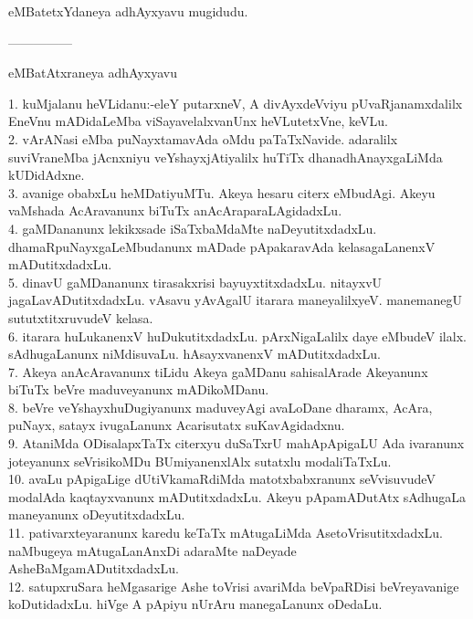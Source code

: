 \documentclass{article}
\begin{document}
\begin{center}
eMBatetxYdaneya adhAyxyavu mugidudu.
\end{center}

\begin{center}
---------------
\end{center}

\begin{center}
eMBatAtxraneya adhAyxyavu
\end{center}

1. kuMjalanu heVLidanu:-eleY putarxneV, A divAyxdeVviyu pUvaRjanamxdalilx EneVnu mADidaLeMba viSayavelalxvanUnx heVLutetxVne, keVLu.\\
2. vArANasi eMba puNayxtamavAda oMdu paTaTxNavide. adaralilx suviVraneMba jAcnxniyu veYshayxjAtiyalilx huTiTx dhanadhAnayxgaLiMda kUDidAdxne.\\
3. avanige obabxLu heMDatiyuMTu. Akeya hesaru citerx eMbudAgi. Akeyu vaMshada AcAravanunx biTuTx anAcAraparaLAgidadxLu.\\
4. gaMDananunx lekikxsade iSaTxbaMdaMte naDeyutitxdadxLu. dhamaRpuNayxgaLeMbudanunx mADade pApakaravAda kelasagaLanenxV mADutitxdadxLu.\\
5. dinavU gaMDananunx tirasakxrisi bayuyxtitxdadxLu. nitayxvU jagaLavADutitxdadxLu. vAsavu yAvAgalU itarara maneyalilxyeV. manemanegU sututxtitxruvudeV kelasa.\\
6. itarara huLukanenxV huDukutitxdadxLu. pArxNigaLalilx daye eMbudeV ilalx. sAdhugaLanunx niMdisuvaLu. hAsayxvanenxV mADutitxdadxLu.\\
7. Akeya anAcAravanunx tiLidu Akeya gaMDanu sahisalArade Akeyanunx biTuTx beVre maduveyanunx mADikoMDanu.\\
8. beVre veYshayxhuDugiyanunx maduveyAgi avaLoDane dharamx, AcAra, puNayx, satayx ivugaLanunx Acarisutatx suKavAgidadxnu.\\
9. AtaniMda ODisalapxTaTx citerxyu duSaTxrU mahApApigaLU Ada ivaranunx joteyanunx seVrisikoMDu BUmiyanenxlAlx sutatxlu modaliTaTxLu.\\
10. avaLu pApigaLige dUtiVkamaRdiMda matotxbabxranunx seVvisuvudeV modalAda kaqtayxvanunx mADutitxdadxLu. Akeyu pApamADutAtx sAdhugaLa maneyanunx oDeyutitxdadxLu.\\
11. pativarxteyaranunx karedu keTaTx mAtugaLiMda AsetoVrisutitxdadxLu. naMbugeya mAtugaLanAnxDi adaraMte naDeyade AsheBaMgamADutitxdadxLu.\\
12. satupxruSara heMgasarige Ashe toVrisi avariMda beVpaRDisi beVreyavanige koDutidadxLu. hiVge A pApiyu nUrAru manegaLanunx oDedaLu.\\
\end{document}
